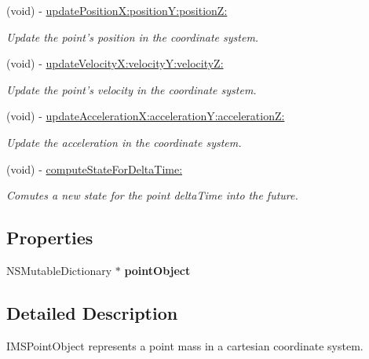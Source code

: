 \begin{CompactItemize}
\item 
(void) - \hyperlink{interface_i_m_s_r_point_object_151a5fa0c67135b90a0de70b061276c3}{updatePositionX:positionY:positionZ:}
\begin{CompactList}\small\item\em Update the point's position in the coordinate system. \item\end{CompactList}\item 
(void) - \hyperlink{interface_i_m_s_r_point_object_55fbe7e8642006b44ebeedc850b5c728}{updateVelocityX:velocityY:velocityZ:}
\begin{CompactList}\small\item\em Update the point's velocity in the coordinate system. \item\end{CompactList}\item 
(void) - \hyperlink{interface_i_m_s_r_point_object_1a32028d39d5f3e7fd976cac12040a54}{updateAccelerationX:accelerationY:accelerationZ:}
\begin{CompactList}\small\item\em Update the acceleration in the coordinate system. \item\end{CompactList}\item 
(void) - \hyperlink{interface_i_m_s_r_point_object_ae14396d83b2edd2f34b0bfb0f35a501}{computeStateForDeltaTime:}
\begin{CompactList}\small\item\em Comutes a new state for the point deltaTime into the future. \item\end{CompactList}\end{CompactItemize}
\subsection*{Properties}
\begin{CompactItemize}
\item 
\hypertarget{interface_i_m_s_r_point_object_d480bf9c62356db805af3b924b766c84}{
NSMutableDictionary $\ast$ \textbf{pointObject}}
\label{interface_i_m_s_r_point_object_d480bf9c62356db805af3b924b766c84}

\end{CompactItemize}


\subsection{Detailed Description}
IMSPointObject represents a point mass in a cartesian coordinate system. 


